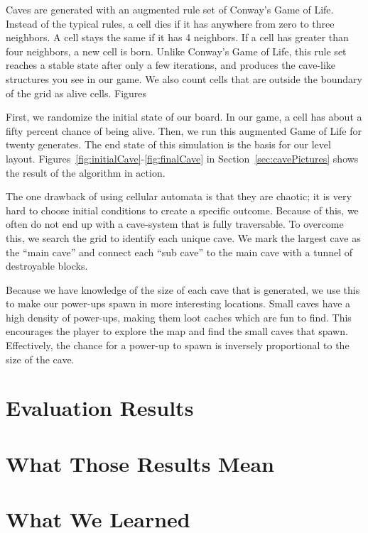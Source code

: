 \documentclass[a4paper, 12pt]{article}
\begin{document}
Caves are generated with an augmented rule set of Conway's Game of Life. Instead
of the typical rules, a cell dies if it has anywhere from zero to three
neighbors. A cell stays the same if it has 4 neighbors. If a cell has greater
than four neighbors, a new cell is born. Unlike Conway's Game of Life, this
rule set reaches a stable state after only a few iterations, and produces the
cave-like structures you see in our game. We also count cells that are outside
the boundary of the grid as alive cells. Figures

First, we randomize the initial state of our board. In our game, a cell has
about a fifty percent chance of being alive. Then, we run this augmented Game of
Life for twenty generates. The end state of this simulation is the basis for our
level layout. Figures~\ref{fig:initialCave}-\ref{fig:finalCave} in
Section~\ref{sec:cavePictures} shows the result of the algorithm in action.

The one drawback of using cellular automata is that they are chaotic; it is very
hard to choose initial conditions to create a specific outcome. Because of this,
we often do not end up with a cave-system that is fully traversable. To overcome
this, we search the grid to identify each unique cave. We mark the largest cave
as the ``main cave'' and connect each ``sub cave'' to the main cave with a
tunnel of destroyable blocks.

Because we have knowledge of the size of each cave that is generated, we use
this to make our power-ups spawn in more interesting locations. Small caves have
a high density of power-ups, making them loot caches which are fun to find. This
encourages the player to explore the map and find the small caves that spawn.
Effectively, the chance for a power-up to spawn is inversely proportional to the
size of the cave.



\section{Evaluation Results}



\section{What Those Results Mean}



\section{What We Learned}
\end{document}
